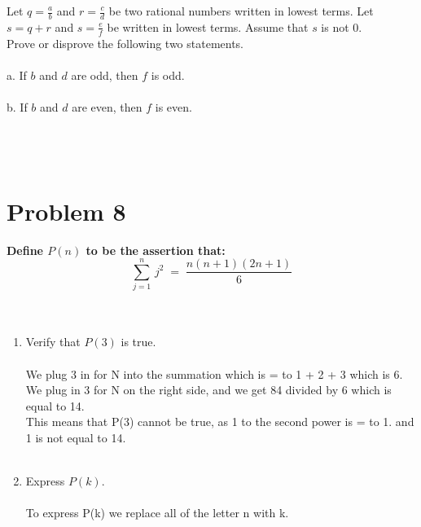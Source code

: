 \begin{enumerate}
Let $\displaystyle q = \frac{a}{b}$ and $\displaystyle r = \frac{c}{d}$ be two rational numbers written in lowest terms. Let $s = q + r$ and $\displaystyle s = \frac{e}{f}$ be written in lowest terms. Assume that $s$ is not $0$.\\

 Prove or disprove the following two statements.
\\\\
a.  If $b$ and $d$ are odd, then $f$ is odd.
\\\\
b. If $b$ and $d$ are even, then $f$ is even.
\\\\



\\\\


\newpage

\section*{Problem 8}
{\bf Define $P(n)$ to be the assertion that:}\\
\[\displaystyle \sum_{j=1}^{n}\, j^2 \;=\;\frac{n(n+1)(2n+1)}{6}\]\\\\
\begin{enumerate}[label=(\alph*)]
  \item Verify that $P(3)$ is true.\\\\
   We plug 3 in for N into the summation which is = to 1 + 2 + 3 which is 6. \\
We plug in 3 for N on the right side, and we get 84 divided by 6 which is equal to 14. \\
This means that P(3) cannot be true, as 1 to the second power is = to 1. and 1 is not equal to 14.
   \\\\
  \item Express $P(k)$.\\\\
To express P(k) we replace all of the letter n with k. \\


\end{enumerate}
\end{enumerate}
